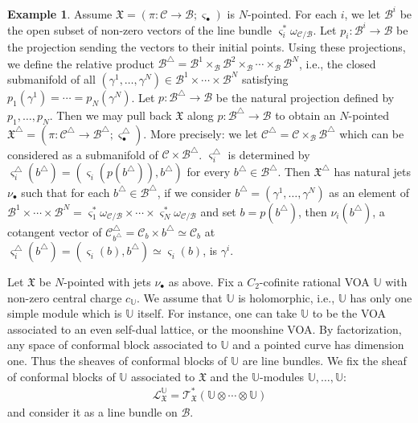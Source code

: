\documentclass[12pt,a4paper,notitlepage]{report}
\theoremstyle{definition}
\newtheorem{eg}[df]{Example}
\theoremstyle{plain}
\newcommand{\fk}{\mathfrak}
\newcommand{\mc}{\mathcal}
\newcommand{\scr}{\mathscr}
\newcommand{\sgm}{\varsigma}
\newcommand{\blt}{\bullet}
\newcommand{\Ubb}{\mathbb U}
\numberwithin{equation}{section}
\begin{document}
\begin{eg}
Assume $\fk X=(\pi:\mc C\rightarrow\mc B;\sgm_\blt)$ is $N$-pointed. For each $i$, we let $\mc B^i$ be the open subset of non-zero vectors of the line bundle $\sgm_i^*\omega_{\mc C/\mc B}$.  Let $p_i:\mc B^i\rightarrow\mc B$ be the projection sending the vectors to their initial points. Using these projections, we define the relative product $\mc B^\triangle=\mc B^1\times_{\mc B}\mc B^2\times_{\mc B}\cdots \times_{\mc B}\mc B^N$, i.e., the closed submanifold of all $(\gamma^1,\dots,\gamma^N)\in \mc B^1\times\cdots\times \mc B^N$ satisfying $p_1(\gamma^1)=\cdots= p_N(\gamma^N)$. Let $p:\mc B^\triangle\rightarrow\mc B$ be the natural projection defined by $p_1,\dots,p_N$. Then we may pull back $\fk X$ along $p:\mc B^\triangle\rightarrow\mc B$ to obtain an $N$-pointed $\fk X^\triangle=(\pi:\mc C^\triangle\rightarrow\mc B^\triangle;\sgm_\blt^\triangle)$. More precisely: we let $\mc C^\triangle=\mc C\times_{\mc B}\mc B^\triangle$ which can be considered as a submanifold of $\mc C\times\mc B^\triangle$. $\sgm_i^\triangle$ is determined by $\sgm_i^\triangle(b^\triangle)=(\sgm_i(p(b^\triangle)),b^\triangle)$ for every $b^\triangle\in\mc B^\triangle$. Then $\fk X^\triangle$ has natural jets $\nu_\blt$ such that for each $b^\triangle\in\mc B^\triangle$, if we consider $b^\triangle=(\gamma^1,\dots,\gamma^N)$  as an element of $\mc B^1\times\cdots\times\mc B^N=\sgm_1^*\omega_{\mc C/\mc B}\times\cdots\times\sgm_N^*\omega_{\mc C/\mc B}$ and set $b=p(b^\triangle)$, then $\nu_i(b^\triangle)$, a cotangent vector of $\mc C^\triangle_{b^\triangle}=\mc C_b\times b^\triangle\simeq \mc C_b$ at $\sgm_i^\triangle(b^\triangle)=(\sgm_i(b),b^\triangle)\simeq \sgm_i(b)$, is $\gamma^i$.
\end{eg}




Let $\fk X$ be $N$-pointed with jets $\nu_\blt$ as above. Fix a $C_2$-cofinite rational VOA $\Ubb$ with non-zero central charge $c_\Ubb$. We assume that $\Ubb$ is holomorphic, i.e., $\Ubb$ has only one simple module which is $\Ubb$ itself. For instance, one can take $\Ubb$ to be the VOA associated to an even self-dual lattice, or the moonshine VOA. By factorization, any space of conformal block associated to $\Ubb$ and a pointed curve has dimension one. Thus the sheaves of conformal blocks of $\Ubb$ are line bundles. We fix the sheaf of conformal blocks of $\Ubb$ associated to $\fk X$ and the $\Ubb$-modules \index{LXU@$\scr L_{\fk X}^\Ubb$} $\Ubb,\dots,\Ubb$:
\begin{align*}
\scr L_{\fk X}^\Ubb=\scr T_{\fk X}^*(\Ubb\otimes\cdots\otimes\Ubb)
\end{align*}
and consider it as a line bundle on $\mc B$.
\end{document}
